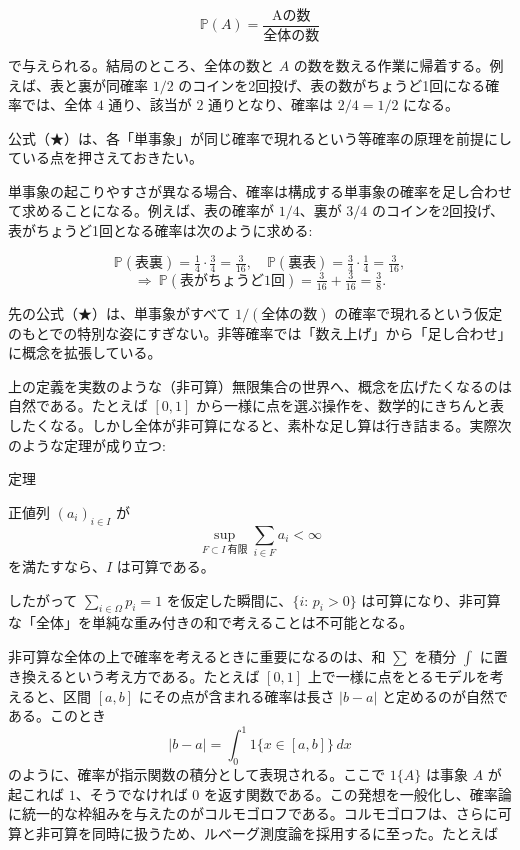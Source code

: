 \documentclass[a4paper,10pt,pdflatex,ja=standard,jafont=ipaex-type1,
  magstyle=real,scale=1]{bxjsarticle}
\newcommand{\keybox}[1]{\par\vspace{3pt}\begingroup
  \setlength{\fboxsep}{5pt}
  \colorbox{soft}{\parbox{\dimexpr\linewidth-2\fboxsep\relax}{#1}}%
  \endgroup\par\vspace{2pt}}
\newcommand{\examplelabel}[1]{{\sffamily\mdseries\color{ink}#1}}
\begin{document}
\begin{equation*}
\mathbb P(A)=\frac{\text{Aの数}}{\text{全体の数}}\tag{★}
\end{equation*}

で与えられる。結局のところ、全体の数と $A$ の数を数える作業に帰着する。例えば、表と裏が同確率 $1/2$ のコインを2回投げ、表の数がちょうど1回になる確率では、全体 $4$ 通り、該当が $2$ 通りとなり、確率は $2/4=1/2$ になる。\par

{\small\color{muted} 公式（★）は、各「単事象」が同じ確率で現れるという等確率の原理を前提にしている点を押さえておきたい。}\par

単事象の起こりやすさが異なる場合、確率は構成する単事象の確率を足し合わせて求めることになる。例えば、表の確率が $1/4$、裏が $3/4$ のコインを2回投げ、表がちょうど1回となる確率は次のように求める:\par

$$ \mathbb P(\text{表裏})=\tfrac{1}{4}\cdot\tfrac{3}{4}=\tfrac{3}{16},\quad \mathbb P(\text{裏表})=\tfrac{3}{4}\cdot\tfrac{1}{4}=\tfrac{3}{16}, $$ $$\Rightarrow\ \mathbb P(\text{表がちょうど1回})=\tfrac{3}{16}+\tfrac{3}{16}=\tfrac{3}{8}. $$

先の公式（★）は、単事象がすべて $1/(\text{全体の数})$ の確率で現れるという仮定のもとでの特別な姿にすぎない。非等確率では「数え上げ」から「足し合わせ」に概念を拡張している。\par

上の定義を実数のような（非可算）無限集合の世界へ、概念を広げたくなるのは自然である。たとえば $[0,1]$ から一様に点を選ぶ操作を、数学的にきちんと表したくなる。しかし全体が非可算になると、素朴な足し算は行き詰まる。実際次のような定理が成り立つ:\par

\keybox{
\examplelabel{定理}\par
正値列 $(a_i)_{i\in I}$ が $$ \sup_{F\subset I\ \text{有限}}\sum_{i\in F} a_i < \infty $$ を満たすなら、$I$ は可算である。\par

{\small\color{muted} したがって $\sum_{i\in \Omega} p_i = 1$ を仮定した瞬間に、$\{i:\,p_i>0\}$ は可算になり、非可算な「全体」を単純な重み付きの和で考えることは不可能となる。}\par
}

\newpage
\columncontinuation

非可算な全体の上で確率を考えるときに重要になるのは、和 $\sum$ を積分 $\int$ に置き換えるという考え方である。たとえば $[0,1]$ 上で一様に点をとるモデルを考えると、区間 $[a,b]$ にその点が含まれる確率は長さ $|b-a|$ と定めるのが自然である。このとき $$ |b-a| = \int_{0}^{1} \mathrm{1}\{x \in [a,b]\}\, dx $$ のように、確率が指示関数の積分として表現される。ここで $\mathrm{1}\{A\}$ は事象 $A$ が起これば $1$、そうでなければ $0$ を返す関数である。この発想を一般化し、確率論に統一的な枠組みを与えたのがコルモゴロフである。コルモゴロフは、さらに可算と非可算を同時に扱うため、ルベーグ測度論を採用するに至った。たとえば\par
\end{document}
